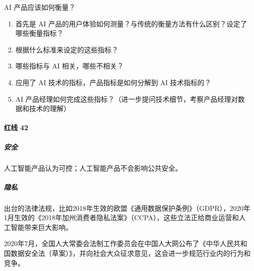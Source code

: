 \documentclass[letterpaper,11pt,english]{sphinxmanual}
\begin{document}
AI
产品应该如何衡量？%
\begin{footnote}[260]\sphinxAtStartFootnote
{}
%
\end{footnote}
\begin{enumerate}
%
\item {} 
首先是 AI
产品的用户体验如何测量？与传统的衡量方法有什么区别？设定了哪些衡量指标？

\item {} 
根据什么标准来设定的这些指标？

\item {} 
哪些指标与 AI 相关，哪些不相关？

\item {} 
应用了 AI 技术的指标，产品指标是如何分解到 AI 技术指标的？

\item {} 
AI
产品经理如何完成这些指标？（进一步提问技术细节，考察产品经理对数据和技术的理解）

\end{enumerate}


\paragraph{红线 42\sphinxfootnotemark[261]}
\label{\detokenize{chapter_introduction/AI_PM:id36}}%
\begin{footnotetext}[261]\sphinxAtStartFootnote
{}
%
\end{footnotetext}\ignorespaces 

\subparagraph{安全}
\label{\detokenize{chapter_introduction/AI_PM:id37}}
人工智能产品认为可控；人工智能产品不会影响公共安全。


\subparagraph{隐私}
\label{\detokenize{chapter_introduction/AI_PM:id38}}
出台的法律法规，比如2018年生效的欧盟《通用数据保护条例》（GDPR），2020年1月生效的《2018年加州消费者隐私法案》（CCPA），这些立法正给商业运营和人工智能带来巨大影响。

2020年7月，全国人大常委会法制工作委员会在中国人大网公布了《中华人民共和国数据安全法（草案）》，并向社会大众征求意见，这会进一步规范行业内的行为和竞争。
%
\begin{footnote}[262]\sphinxAtStartFootnote
{}
%
\end{footnote}
\end{document}
